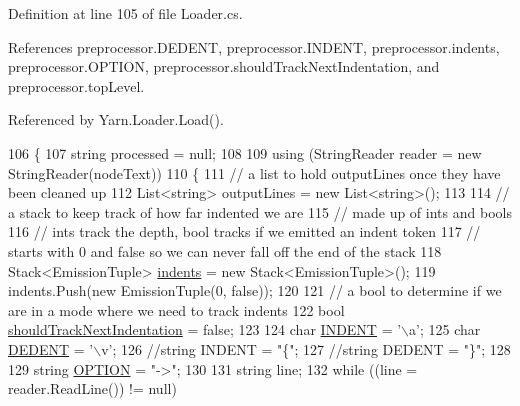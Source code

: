 Definition at line 105 of file Loader.\-cs.



References preprocessor.\-D\-E\-D\-E\-N\-T, preprocessor.\-I\-N\-D\-E\-N\-T, preprocessor.\-indents, preprocessor.\-O\-P\-T\-I\-O\-N, preprocessor.\-should\-Track\-Next\-Indentation, and preprocessor.\-top\-Level.



Referenced by Yarn.\-Loader.\-Load().


\begin{DoxyCode}
106         \{
107             \textcolor{keywordtype}{string} processed = null;
108 
109             \textcolor{keyword}{using} (StringReader reader = \textcolor{keyword}{new} StringReader(nodeText))
110             \{
111                 \textcolor{comment}{// a list to hold outputLines once they have been cleaned up}
112                 List<string> outputLines = \textcolor{keyword}{new} List<string>();
113 
114                 \textcolor{comment}{// a stack to keep track of how far indented we are}
115                 \textcolor{comment}{// made up of ints and bools}
116                 \textcolor{comment}{// ints track the depth, bool tracks if we emitted an indent token}
117                 \textcolor{comment}{// starts with 0 and false so we can never fall off the end of the stack}
118                 Stack<EmissionTuple> \hyperlink{a00336_a00fba9ee9674b2513dbe28eab795b734}{indents} = \textcolor{keyword}{new} Stack<EmissionTuple>();
119                 indents.Push(\textcolor{keyword}{new} EmissionTuple(0, \textcolor{keyword}{false}));
120 
121                 \textcolor{comment}{// a bool to determine if we are in a mode where we need to track indents}
122                 \textcolor{keywordtype}{bool} \hyperlink{a00336_afa485f45ab87bc0f06c1dfc46737c057}{shouldTrackNextIndentation} = \textcolor{keyword}{false};
123 
124                 \textcolor{keywordtype}{char} \hyperlink{a00336_ae3f2190a793ab77428838e58e0e83676}{INDENT} = \textcolor{charliteral}{'\(\backslash\)a'};
125                 \textcolor{keywordtype}{char} \hyperlink{a00336_a83653c3e52fa74614e655a91ad2b7181}{DEDENT} = \textcolor{charliteral}{'\(\backslash\)v'};
126                 \textcolor{comment}{//string INDENT = "\{";}
127                 \textcolor{comment}{//string DEDENT = "\}";}
128 
129                 \textcolor{keywordtype}{string} \hyperlink{a00336_a7ca2dc5371587b21476669a45af013cd}{OPTION} = \textcolor{stringliteral}{"->"};
130 
131                 \textcolor{keywordtype}{string} line;
132                 \textcolor{keywordflow}{while} ((line = reader.ReadLine()) != null)

\end{DoxyCode}
